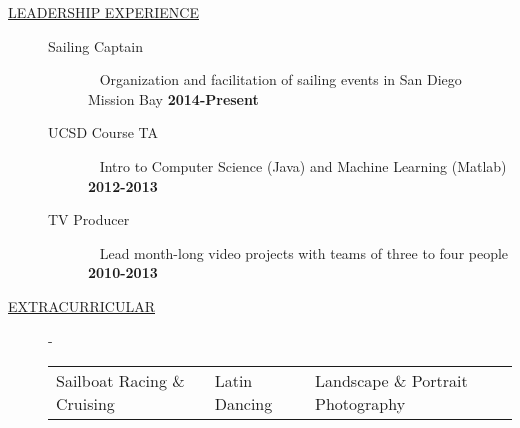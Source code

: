 \documentclass[11pt]{article}
\begin{document}
\begin{description}
    \fi

    \item[\underline{LEADERSHIP EXPERIENCE}] \hfill
        \begin{description}
            \item[Sailing Captain] \textbullet ~ Organization and facilitation of sailing events in San Diego Mission Bay \hfill \textbf{2014-Present}
            \item[UCSD Course TA]
                \textbullet ~ Intro to Computer Science (Java) and Machine Learning (Matlab)    \hfill \textbf{2012-2013}
            \item[TV Producer] \textbullet ~ Lead month-long video projects with teams of three to four people \hfill \textbf{2010-2013}
        \end{description}

    \item[\underline{EXTRACURRICULAR}] -
        \begin{tabular}{l|l|l}
            Sailboat Racing \& Cruising & Latin Dancing & Landscape \& Portrait Photography
        \end{tabular}

    \iffalse
    \item[\underline{REFERENCES}] - Available upon request
    \fi 

\end{description}
\end{document}
